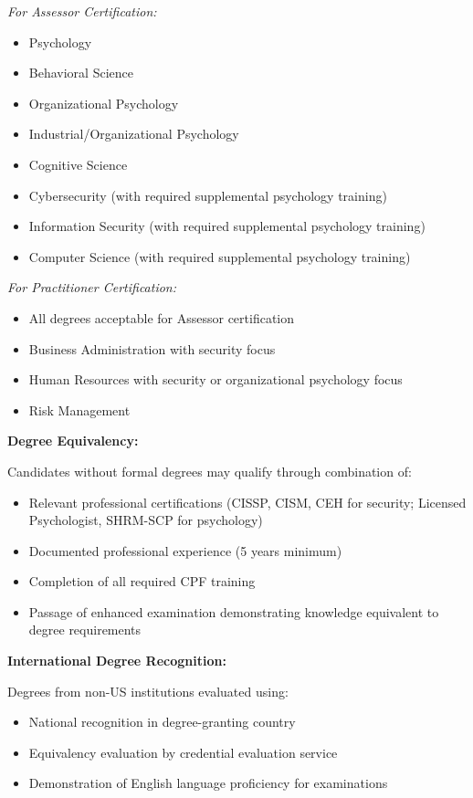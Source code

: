 \documentclass[11pt,a4paper]{article}
\begin{document}
\textit{For Assessor Certification:}
\begin{itemize}
\item Psychology
\item Behavioral Science
\item Organizational Psychology
\item Industrial/Organizational Psychology
\item Cognitive Science
\item Cybersecurity (with required supplemental psychology training)
\item Information Security (with required supplemental psychology training)
\item Computer Science (with required supplemental psychology training)
\end{itemize}

\textit{For Practitioner Certification:}
\begin{itemize}
\item All degrees acceptable for Assessor certification
\item Business Administration with security focus
\item Human Resources with security or organizational psychology focus
\item Risk Management
\end{itemize}

\textbf{Degree Equivalency:}

Candidates without formal degrees may qualify through combination of:
\begin{itemize}
\item Relevant professional certifications (CISSP, CISM, CEH for security; Licensed Psychologist, SHRM-SCP for psychology)
\item Documented professional experience (5 years minimum)
\item Completion of all required CPF training
\item Passage of enhanced examination demonstrating knowledge equivalent to degree requirements
\end{itemize}

\textbf{International Degree Recognition:}

Degrees from non-US institutions evaluated using:
\begin{itemize}
\item National recognition in degree-granting country
\item Equivalency evaluation by credential evaluation service
\item Demonstration of English language proficiency for examinations
\end{itemize}
\end{document}
